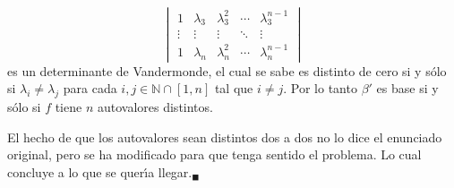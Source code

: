 \begin{solucion}
\begin{equation*}
\begin{vmatrix}
   1 & \lambda_3 & \lambda_3^2 & \cdots & \lambda_3^{n-1} \\
   \vdots & \vdots & \vdots & \ddots & \vdots \\
   1 & \lambda_n & \lambda_n^2 & \cdots & \lambda_n^{n-1}
  \end{vmatrix}
 \end{equation*}
 es un determinante de Vandermonde, el cual se sabe es distinto de cero si y s\'olo si $\lambda_i \neq \lambda_j$ para cada $i,j \in \mathbb{N}\cap[1,n]$ tal que $i\neq j$.
 Por lo tanto $\beta'$ es base si y s\'olo si $f$ tiene $n$ autovalores distintos.
 \par 
 El hecho de que los autovalores sean distintos dos a dos no lo dice el enunciado original, pero se ha modificado para que tenga sentido el problema. Lo cual concluye a lo que se quer\'{\i}a llegar.${}_{\blacksquare}$
\end{solucion}
